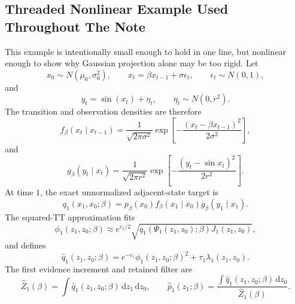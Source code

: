\documentclass[11pt]{article}
\numberwithin{equation}{section}
\newcommand{\dd}{\,\mathrm d}
\begin{document}
\subsection{Threaded Nonlinear Example Used Throughout The Note}

This example is intentionally small enough to hold in one line, but nonlinear
enough to show why Gaussian projection alone may be too rigid.  Let
\begin{equation}
    x_0\sim N(\mu_0,\sigma_0^2),
    \qquad
    x_t=\beta x_{t-1}+\sigma\epsilon_t,
    \qquad
    \epsilon_t\sim N(0,1),
    \label{eq:p24-p23-e1}
\end{equation}
and
\begin{equation}
    y_t=\sin(x_t)+\eta_t,
    \qquad
    \eta_t\sim N(0,r^2).
    \label{eq:p24-p23-e2}
\end{equation}
The transition and observation densities are therefore
\begin{equation}
    f_\beta(x_t\mid x_{t-1})
    =
    \frac{1}{\sqrt{2\pi\sigma^2}}
    \exp\!\left[-\frac{(x_t-\beta x_{t-1})^2}{2\sigma^2}\right],
    \label{eq:p24-p23-e3}
\end{equation}
and
\begin{equation}
    g_\beta(y_t\mid x_t)
    =
    \frac{1}{\sqrt{2\pi r^2}}
    \exp\!\left[-\frac{(y_t-\sin x_t)^2}{2r^2}\right].
    \label{eq:p24-p23-e4}
\end{equation}
At time \(1\), the exact unnormalized adjacent-state target is
\begin{equation}
    q_1(x_1,x_0;\beta)
    =
    p_\beta(x_0)
    f_\beta(x_1\mid x_0)
    g_\beta(y_1\mid x_1).
    \label{eq:p24-p23-e5}
\end{equation}
The squared-TT approximation fits
\begin{equation}
    \phi_1(z_1,z_0;\beta)
    \approx
    e^{c_1/2}
    \sqrt{
    q_1(\Psi_1(z_1,z_0);\beta)
    J_1(z_1,z_0)},
    \label{eq:p24-p23-e6}
\end{equation}
and defines
\begin{equation}
    \widehat q_1(z_1,z_0;\beta)
    =
    e^{-c_1}\phi_1(z_1,z_0;\beta)^2
    +
    \tau_1\lambda_1(z_1,z_0).
    \label{eq:p24-p23-e7}
\end{equation}
The first evidence increment and retained filter are
\begin{equation}
    \widehat Z_1(\beta)
    =
    \int\widehat q_1(z_1,z_0;\beta)\dd z_1\dd z_0,
    \qquad
    \widehat p_1(z_1;\beta)
    =
    \frac{\int\widehat q_1(z_1,z_0;\beta)\dd z_0}
    {\widehat Z_1(\beta)}.
    \label{eq:p24-p23-e8}
\end{equation}
\end{document}
